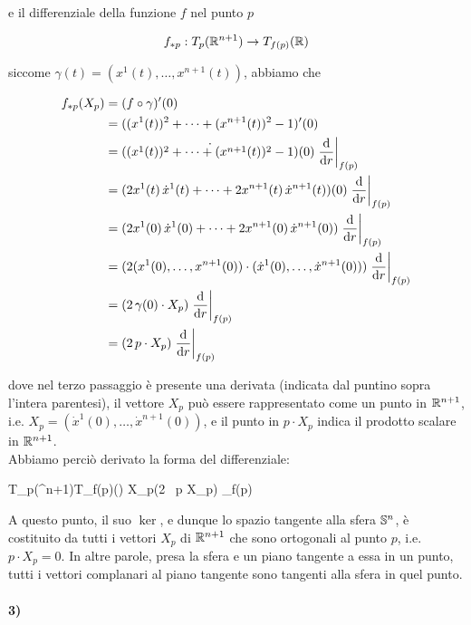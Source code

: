e il differenziale della funzione $ f $ nel punto $ p $

\begin{equation}
	f_{*p} : T_{p}(\R^{n+1}) \to T_{f(p)}(\R)
\end{equation}

siccome $ \gamma(t) = (x^{1}(t),\dots,x^{n+1}(t)) $, abbiamo che

\begin{align}
	\begin{split}
		f_{*p}(X_{p}) &= (f \circ \gamma)'(0)\\
		&= ((x^{1}(t))^{2} + \cdots + (x^{n+1}(t))^{2} - 1)'(0)\\
		&= \dot{((x^{1}(t))^{2} + \cdots + (x^{n+1}(t))^{2} - 1)}(0) \eval{ \dv{r} }_{f(p)}\\
		&= (2 x^{1}(t) \, \dot{x}^{1}(t) + \cdots + 2 x^{n+1}(t) \, \dot{x}^{n+1}(t))(0) \eval{ \dv{r} }_{f(p)}\\
		&= (2 x^{1}(0) \, \dot{x}^{1}(0) + \cdots + 2 x^{n+1}(0) \, \dot{x}^{n+1}(0)) \eval{ \dv{r} }_{f(p)}\\
		&= (2 (x^{1}(0), \dots, x^{n+1}(0)) \cdot (\dot{x}^{1}(0), \dots, \dot{x}^{n+1}(0))) \eval{ \dv{r} }_{f(p)}\\
		&= (2 \, \gamma(0) \cdot X_{p}) \eval{ \dv{r} }_{f(p)}\\
		&= (2 \, p \cdot X_{p}) \eval{ \dv{r} }_{f(p)}
	\end{split}
\end{align}

dove nel terzo passaggio è presente una derivata (indicata dal puntino sopra l'intera parentesi), il vettore $ X_{p} $ può essere rappresentato come un punto in $ \R^{n+1} $, i.e. $ X_{p} = (\dot{x}^{1}(0),\dots,\dot{x}^{n+1}(0)) $, e il punto in $ p \cdot X_{p} $ indica il prodotto scalare in $ \R^{n+1} $.\\
Abbiamo perciò derivato la forma del differenziale:

	{T_{p}(\R^{n+1})}{T_{f(p)}(\R)}
	{X_{p}}{(2 \, p \cdot X_{p}) _{f(p)}}
	
A questo punto, il suo $ \ker $, e dunque lo spazio tangente alla sfera $ \S^{n} $, è costituito da tutti i vettori $ X_{p} $ di $ \R^{n+1} $ che sono ortogonali al punto $ p $, i.e. $ p \cdot X_{p} = 0 $. In altre parole, presa la sfera e un piano tangente a essa in un punto, tutti i vettori complanari al piano tangente sono tangenti alla sfera in quel punto.

\paragraph{3)}\label{ex:subvar-cond}

